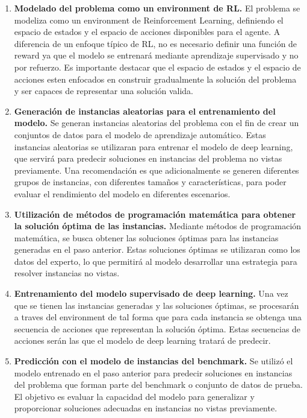 \begin{enumerate}
    \item \textbf{Modelado del problema como un environment de RL.} El problema 
    se modeliza como un environment de Reinforcement Learning, definiendo el espacio de estados 
    y el espacio de acciones disponibles para el agente. A diferencia de un enfoque típico de RL, 
    no es necesario definir una función de reward ya que el modelo se entrenará mediante aprendizaje 
    supervisado y no por refuerzo. Es importante destacar que el espacio de estados y el espacio de
    acciones esten enfocados en construir gradualmente la solución del problema y ser capaces
    de representar una solución valida.
    \item \textbf{Generación de instancias aleatorias para el entrenamiento del modelo.} 
    Se generan instancias aleatorias del problema con el fin de crear un conjuntos de datos 
    para el modelo de aprendizaje automático. Estas instancias aleatorias se utilizaran para entrenar el 
    modelo de deep learning, que servirá para predecir soluciones en instancias del problema no vistas 
    previamente. Una recomendación es que adicionalmente se generen diferentes grupos de instancias,
    con diferentes tamaños y características, para poder evaluar el rendimiento del modelo en diferentes
    escenarios.
    \item \textbf{Utilización de métodos de programación matemática para obtener la solución óptima de 
    las instancias.} Mediante métodos de programación matemática, se busca obtener las soluciones óptimas 
    para las instancias generadas en el paso anterior. Estas soluciones óptimas se utilizaran como los 
    datos del experto, lo que permitirá al modelo desarrollar una estrategia para resolver instancias no vistas.
    \item \textbf{Entrenamiento del modelo supervisado de deep learning.} Una vez que se tienen las instancias
    generadas y las soluciones óptimas, se procesarán a traves del environment de tal forma que para cada
    instancia se obtenga una secuencia de acciones que representan la solución óptima. Estas secuencias de
    acciones serán las que el modelo de deep learning tratará de predecir.
    \item \textbf{Predicción con el modelo de instancias del benchmark.} Se utilizó el modelo entrenado 
    en el paso anterior para predecir soluciones en instancias del problema que forman parte del benchmark 
    o conjunto de datos de prueba. El objetivo es evaluar la capacidad del modelo para generalizar y 
    proporcionar soluciones adecuadas en instancias no vistas previamente.
\end{enumerate}

